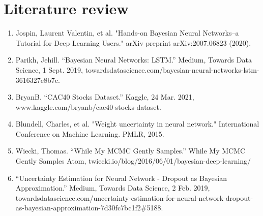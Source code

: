 \documentclass[12pt]{amsart}
\begin{document}
{{%

\bigskip
\section{Literature review}
\begin{enumerate}

	\item Jospin, Laurent Valentin, et al. "Hands-on Bayesian Neural Networks--a Tutorial for Deep Learning Users." arXiv preprint arXiv:2007.06823 (2020). \\

	\item Parikh, Jehill. “Bayesian Neural Networks: LSTM.” Medium, Towards Data Science, 1 Sept. 2019, towardsdatascience.com/bayesian-neural-networks-lstm-3616327e8b7c. \\

	\item BryanB. “CAC40 Stocks Dataset.” Kaggle, 24 Mar. 2021, www.kaggle.com/bryanb/cac40-stocks-dataset. \\

	\item Blundell, Charles, et al. "Weight uncertainty in neural network." International Conference on Machine Learning. PMLR, 2015. \\

	\item Wiecki, Thomas. “While My MCMC Gently Samples.” While My MCMC Gently Samples Atom, twiecki.io/blog/2016/06/01/bayesian-deep-learning/ \\

	\item “Uncertainty Estimation for Neural Network - Dropout as Bayesian Approximation.” Medium, Towards Data Science, 2 Feb. 2019, towardsdatascience.com/uncertainty-estimation-for-neural-network-dropout-as-bayesian-approximation-7d30fc7bc1f2\#5188. 



\end{enumerate}}}
\end{document}
